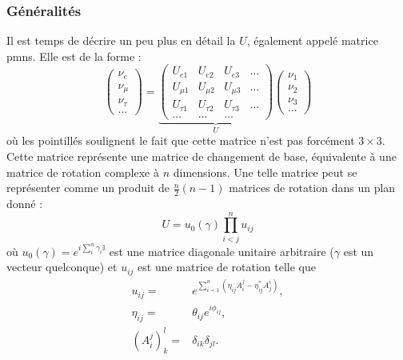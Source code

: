       \subsubsection{Généralités}
        Il est temps de décrire un peu plus en détail la $U$, également appelé matrice \gls{pmns}. Elle est de la forme : 
        \begin{equation}
          \left(\begin{matrix}
            \nu_e \\ \nu_{\mu} \\ \nu_{\tau} \\ ...
          \end{matrix}\right) =
          \underbrace{\left(\begin{matrix}
            U_{e1} & U_{e2} & U_{e3} & ... \\
            U_{\mu 1} & U_{\mu 2} & U_{\mu 3} & ... \\
            U_{\tau 1} & U_{\tau 2} & U_{\tau 3} & ... \\
            ... & ... & ... &
          \end{matrix}\right)}_U
          \left(\begin{matrix}
            \nu_1 \\ \nu_2 \\ \nu_3 \\ ...
          \end{matrix}\right)
        \end{equation}
        où les pointillés soulignent le fait que cette matrice n'est pas forcément $3\times 3$. Cette matrice représente une matrice de changement de base, équivalente à une matrice de rotation complexe à $n$ dimensions. Une telle matrice peut se représenter comme un produit de $\frac{n}{2}(n-1)$ matrices de rotation dans un plan donné\cite{Valle2006,Harari1986} : 
        \begin{equation}\label{eq::compact_pmns}
          U=u_0(\gamma)\prod_{i<j}^n u_{ij}
        \end{equation}
        où $u_0(\gamma)=e^{i \sum_{i}^{n}\gamma_i \mathbb{I}}$ est une matrice diagonale unitaire arbitraire ($\gamma$ est un vecteur quelconque) et $u_{ij}$ est une matrice de rotation telle que
        \begin{equation}
          \begin{split}
            u_{ij}= & e^{\sum_{i=1}^n\left(\eta_{ij}A_i^j-\eta_{ij}^*A_j^i\right)},\\
            \eta_{ij} = & \theta_{ij}e^{i\phi_{ij}},\\
            \left(A_i^j\right)_k^l = & \delta_{ik}\delta_{jl}.
          \end{split}
        \end{equation}
        
